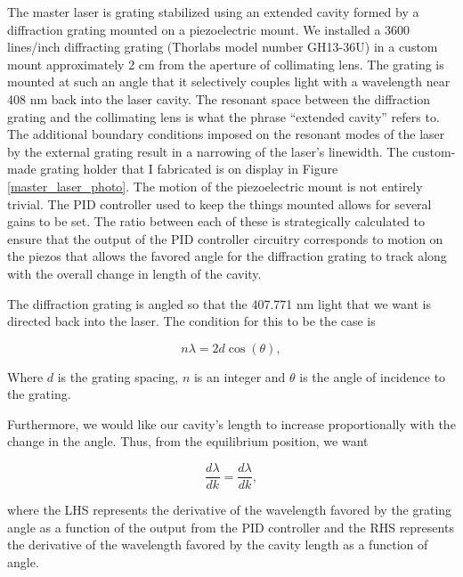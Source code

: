 The master laser is grating stabilized using an extended cavity formed by a diffraction grating mounted on a piezoelectric mount.  
We installed a 3600 lines/inch diffracting grating (Thorlabs model number GH13-36U) in a custom mount approximately 2 cm from the aperture of collimating lens. The grating is mounted at such an angle that it selectively couples light with a wavelength near 408 nm back into the laser cavity. The resonant space between the diffraction grating and the collimating lens is what the phrase ``extended cavity'' refers to. The additional boundary conditions imposed on the resonant modes of the laser by the external grating result in a narrowing of the laser's linewidth. 
The custom-made grating holder that I fabricated is on display in Figure\,\ref{master_laser_photo}. The motion of the piezoelectric mount is not entirely trivial. The PID controller used to keep the things mounted %
allows for several gains to be set. The ratio between each of these is strategically calculated to ensure that the output of the PID controller circuitry corresponds to motion on the piezos that allows the favored angle for the diffraction grating to track along with the overall change in length of the cavity. 
 
The diffraction grating is angled so that the 407.771 nm light that we want is directed back into the laser. The condition for this to be the case is 

\begin{equation}
n \lambda = 2 d \cos(\theta),
\end{equation}

Where $d$ is the grating spacing, $n$ is an integer and $\theta$ is the angle of incidence to the grating. 

Furthermore, we would like our cavity's length to increase proportionally with the change in the angle. Thus, from the equilibrium position, we want 

\begin{equation}
\frac{d \lambda}{d k} = \frac{d \lambda}{d k},
\end{equation}

where the LHS represents the derivative of the wavelength favored by the grating angle as a function of the output from the PID controller and the RHS represents the derivative of the wavelength favored by the cavity length as a function of angle. 


